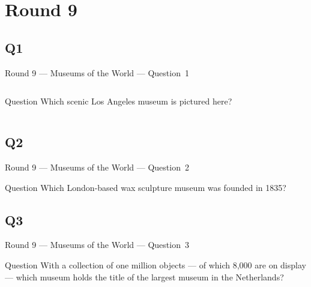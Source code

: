 \documentclass[11pt]{beamer}
\begin{document}
\section{Round 9}
\subsection*{Q1}
\begin{frame}[t]{Round 9 --- Museums of the World --- \mbox{Question 1}}
\vspace{-0.5em}
\begin{columns}[T,totalwidth=\linewidth]
\begin{column}{0.32\linewidth}
\begin{block}{Question}
Which scenic Los Angeles museum is pictured here?
\end{block}
\end{column}
\begin{column}{0.65\linewidth}
\begin{center}
\texttt{[image: \{Images/getty]}.jpg}
\end{center}
\end{column}
\end{columns}
\end{frame}
\subsection*{Q2}
\begin{frame}[t]{Round 9 --- Museums of the World --- \mbox{Question 2}}
\vspace{-0.5em}
\begin{block}{Question}
Which London-based wax sculpture museum was founded in 1835?
\end{block}
\end{frame}
\subsection*{Q3}
\begin{frame}[t]{Round 9 --- Museums of the World --- \mbox{Question 3}}
\vspace{-0.5em}
\begin{block}{Question}
With a collection of one million objects --- of which 8,000 are on display --- which museum holds the title of the largest museum in the Netherlands?
\end{block}
\end{frame}
\end{document}
